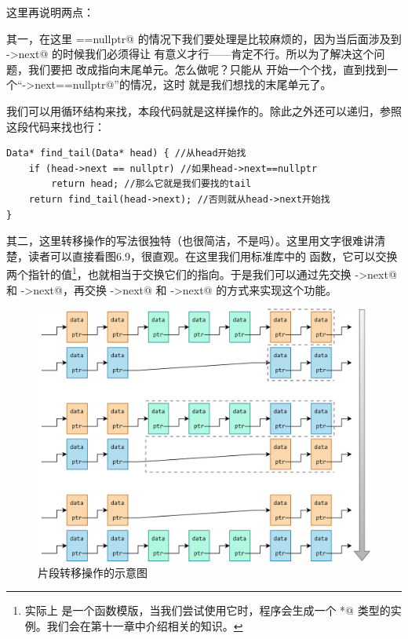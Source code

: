 这里再说明两点：\par
其一，在这里 \lstinline@tail==nullptr@ 的情况下我们要处理是比较麻烦的，因为当后面涉及到 \lstinline@tail->next@ 的时候我们必须得让 \lstinline@tail@ 有意义才行——\lstinline@nullptr@ 肯定不行。所以为了解决这个问题，我们要把 \lstinline@tail@ 改成指向末尾单元。怎么做呢？只能从 \lstinline@head@ 开始一个个找，直到找到一个``\lstinline@tail->next==nullptr@''的情况，这时 \lstinline@tail@ 就是我们想找的末尾单元了。\par
我们可以用循环结构来找，本段代码就是这样操作的。除此之外还可以递归，参照这段代码来找也行：
\begin{lstlisting}
Data* find_tail(Data* head) { //从head开始找
    if (head->next == nullptr) //如果head->next==nullptr
        return head; //那么它就是我们要找的tail
    return find_tail(head->next); //否则就从head->next开始找
}
\end{lstlisting}\par
其二，这里转移操作的写法很独特（也很简洁，不是吗）。这里用文字很难讲清楚，读者可以直接看图6.9，很直观。在这里我们用标准库中的 \lstinline@swap@ 函数，它可以交换两个指针的值\footnote{实际上 \lstinline@swap@ 是一个函数模版，当我们尝试使用它时，程序会生成一个 \lstinline@Data*@ 类型的实例。我们会在第十一章中介绍相关的知识。}，也就相当于交换它们的指向。于是我们可以通过先交换 \lstinline@tail->next@ 和 \lstinline@dest->next@，再交换 \lstinline@head->next@ 和 \lstinline@dest->next@ 的方式来实现这个功能。\par
\begin{figure}[htbp]
    \centering
    \includegraphics[width=\textwidth]{../images/generalized_parts/06_range_transfer_between_lists_300.png}
    \caption{片段转移操作的示意图}
\end{figure}
